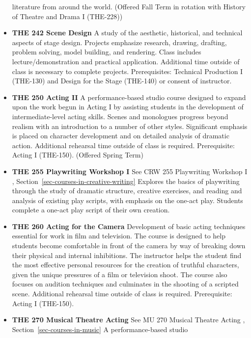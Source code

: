 \documentclass[
  letterpaper,
]{scrbook}
\begin{document}
\begin{itemize}
  literature from around the world. (Offered Fall Term in rotation with
  History of Theatre and Drama I (THE-228))\\
\item
  \textbf{THE 242 Scene Design} A study of the aesthetic, historical,
  and technical aspects of stage design. Projects emphasize research,
  drawing, drafting, problem solving, model building, and rendering.
  Class includes lecture/demonstration and practical application.
  Additional time outside of class is necessary to complete projects.
  Prerequisites: Technical Production I (THE-130) and Design for the
  Stage (THE-140) or consent of instructor.
\item
  \textbf{THE 250 Acting II} A performance-based studio course designed
  to expand upon the work begun in Acting I by assisting students in the
  development of intermediate-level acting skills. Scenes and monologues
  progress beyond realism with an introduction to a number of other
  styles. Significant emphasis is placed on character development and on
  detailed analysis of dramatic action. Additional rehearsal time
  outside of class is required. Prerequisite: Acting I (THE-150).
  (Offered Spring Term)\\
\item
  \textbf{THE 255 Playwriting Workshop I} See CRW 255 Playwriting
  Workshop I , Section~\ref{sec-courses-in-creative-writing} Explores
  the basics of playwriting through the study of dramatic structure,
  creative exercises, and reading and analysis of existing play scripts,
  with emphasis on the one-act play. Students complete a one-act play
  script of their own creation.
\item
  \textbf{THE 260 Acting for the Camera} Development of basic acting
  techniques essential for work in film and television. The course is
  designed to help students become comfortable in front of the camera by
  way of breaking down their physical and internal inhibitions. The
  instructor helps the student find the most effective personal
  resources for the creation of truthful characters, given the unique
  pressures of a film or television shoot. The course also focuses on
  audition techniques and culminates in the shooting of a scripted
  scene. Additional rehearsal time outside of class is required.
  Prerequisite: Acting I (THE-150).\\
\item
  \textbf{THE 270 Musical Theatre Acting} See MU 270 Musical Theatre
  Acting , Section~\ref{sec-courses-in-music} A performance-based studio

\end{itemize}
\end{document}
